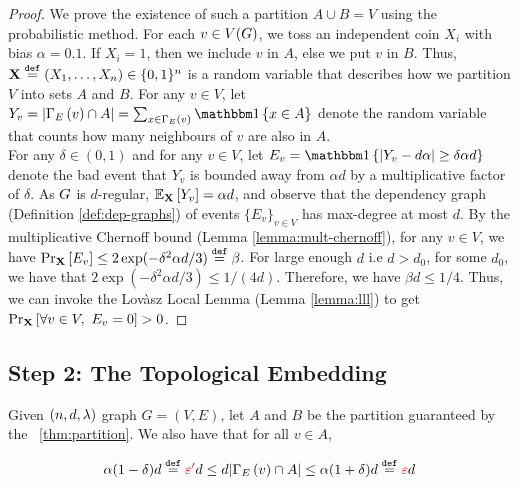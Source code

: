 \documentclass[11pt]{article}
\begin{document}
\begin{proof}We prove the existence of such a partition $A \cup B = V$ using the probabilistic method.
For each $v \in \Vertices{\Graph}$, we toss an independent coin $X_i$ with bias $\alpha=0.1$.
If $X_i = 1$, then we include $v$ in $A$, else we put $v$ in $B$.
Thus, $\vec{X} \Def (X_1, \dots, X_n) \in \bit^n$ is a random variable that describes how we partition $V$ into sets $A$ and $B$.
For any $v \in V$, let $Y_v = |\Neighbourhood{\EdgesShort}{v} \cap A| = \sum_{x \in \Neighbourhood{E}{v}} \Indicator{x \in A}$ denote the random variable that counts how many neighbours of $v$ are also in $A$.\\
For any $\delta \in (0,1)$ and for any $v \in V$, let $E_v = \Indicator{|Y_v - d\alpha | \geq \delta \alpha d}$ denote the bad event that $Y_v$ is bounded away from $\alpha d$ by a multiplicative factor of $\delta$.
As $\Graph$ is $d$-regular, $\Mean{\vec{X}}{Y_v} = \alpha d$, and observe that the dependency graph (Definition \ref{def:dep-graphs}) of events $\{ E_v \}_{v \in V}$ has max-degree at most $d$.
By the multiplicative Chernoff bound (Lemma \ref{lemma:mult-chernoff}), for any $v \in V$, we have $\PProb{E_v}{\vec{X}} \leq 2\exp(-\delta^2\alpha d/3) \Def \beta$.
For large enough $d$ i.e $d > d_0$, for some $d_0$, we have that $2\exp(-\delta^2\alpha d/3) \leq 1/(4d)$. Therefore, we have $\beta d \leq 1/4$.
Thus, we can invoke the Lov\`asz Local Lemma (Lemma \ref{lemma:lll}) to get $\PProb{\forall v \in V, \text{ } E_v = 0}{\vec{X}} > 0$.

\end{proof}



\subsection{Step 2: The Topological Embedding}

Given $\EnDeeLambda$ graph $G=(V,E)$, let $A$ and $B$ be the partition guaranteed by the \ \ref{thm:partition}.
We also have that for all $v \in A$,  

\[\alpha(1-\delta) d  \Def \EpsLower d \leq d |\Neighbourhood{\EdgesShort}{v} \cap A| \leq \alpha(1+\delta)d \Def \Eps d \]
\end{document}

